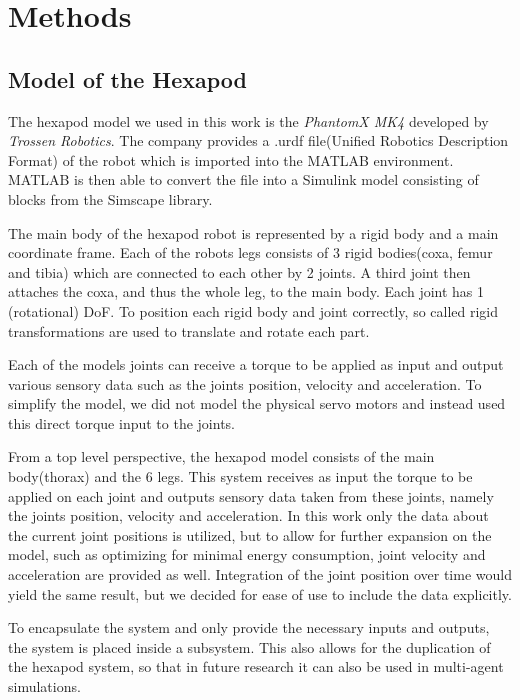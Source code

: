 \graphicspath{ {./images} }

\chapter{Methods}
\label{ch:methods}

\section{Model of the Hexapod}

The hexapod model we used in this work is the \textit{PhantomX MK4} developed by \textit{Trossen Robotics}.
The company provides a .urdf file(Unified Robotics Description Format) of the robot which is imported into the MATLAB environment.
MATLAB is then able to convert the file into a Simulink model consisting of blocks from the Simscape library.

The main body of the hexapod robot is represented by a rigid body and a main coordinate frame.
Each of the robots legs consists of 3 rigid bodies(coxa, femur and tibia) which are connected to each other by 2 joints.
A third joint then attaches the coxa, and thus the whole leg, to the main body.
Each joint has 1 (rotational) DoF.
To position each rigid body and joint correctly, so called rigid transformations are used to translate and rotate each part.

Each of the models joints can receive a torque to be applied as input and output various sensory data such as the joints position, velocity and acceleration. 
To simplify the model, we did not model the physical servo motors and instead used this direct torque input to the joints.

From a top level perspective, the hexapod model consists of the main body(thorax) and the 6 legs.
This system receives as input the torque to be applied on each joint and outputs sensory data taken from these joints, namely the joints position, velocity and acceleration.
In this work only the data about the current joint positions is utilized, but to allow for further expansion on the model, such as optimizing for minimal energy consumption, joint velocity and acceleration are provided as well.
Integration of the joint position over time would yield the same result, but we decided for ease of use to include the data explicitly.

To encapsulate the system and only provide the necessary inputs and outputs, the system is placed inside a subsystem.
This also allows for the duplication of the hexapod system, so that in future research it can also be used in multi-agent simulations.

